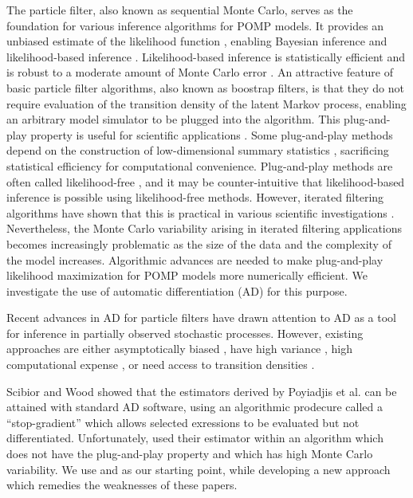 \documentclass[11pt]{article}
\begin{document}
The particle filter, also known as sequential Monte Carlo, serves as the foundation for various inference algorithms for POMP models.
It provides an unbiased estimate of the likelihood function  \cite{delMoral04}, enabling Bayesian inference \cite{andrieu10,chopin13} and likelihood-based inference \cite{ionides06-pnas,ionides15}.
Likelihood-based inference is statistically efficient \cite{pawitan01} and is robust to a moderate amount of Monte Carlo error \cite{ionides17,ning21}.
An attractive feature of basic particle filter algorithms, also known as boostrap filters, is that they do not require evaluation of the transition density of the latent Markov process, enabling an arbitrary model simulator to be plugged into the algorithm.
This plug-and-play property is useful for scientific applications \cite{he10}.
Some plug-and-play methods depend on the construction of low-dimensional summary statistics \cite{wood10,toni09}, sacrificing statistical efficiency for computational convenience.
Plug-and-play methods are often called likelihood-free \cite{owen15}, and it may be counter-intuitive that likelihood-based inference is possible using likelihood-free methods. 
However, iterated filtering algorithms have shown that this is practical in various scientific investigations \cite{king08,blake14,pons-salort18,subramanian21,fox22,drake23}.
Nevertheless, the Monte Carlo variability arising in iterated filtering applications becomes increasingly problematic as the size of the data and the complexity of the model increases.
Algorithmic advances are needed to make plug-and-play likelihood maximization for POMP models more numerically efficient.
We investigate the use of automatic differentiation (AD) for this purpose.


Recent advances in AD for particle filters \cite{naesseth18, jonschkowski18, corenflos21, scibior21, singh22} have drawn attention to AD as a tool for inference in partially observed stochastic processes.
However, existing approaches are either asymptotically biased \cite{naesseth18, jonschkowski18}, have high variance \cite{poyiadjis11, scibior21}, high computational expense \cite{corenflos21, chen24}, or need access to transition densities \cite{poyiadjis11, scibior21, singh22, chen24}.

Scibior and Wood \cite{scibior21} showed that the estimators derived by Poyiadjis et al. \cite{poyiadjis11} can be attained with standard AD software, using an algorithmic prodecure called a ``stop-gradient'' which allows selected exressions to be evaluated but not differentiated.
Unfortunately, \cite{scibior21} used their estimator within an algorithm which does not have the plug-and-play property and which has high Monte Carlo variability.
We use \cite{scibior21} and \cite{poyiadjis11} as our starting point, while developing a new approach which remedies the weaknesses of these papers.
\end{document}
